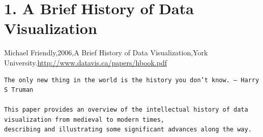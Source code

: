 \documentclass[]{book}
\theoremstyle{definition}
\theoremstyle{definition}
\theoremstyle{definition}
\theoremstyle{remark}
\begin{document}
\section{1. A Brief History of Data
Visualization}\label{a-brief-history-of-data-visualization}

Michael Friendly,2006,A Brief History of Data Visualization,York
University.\url{http://www.datavis.ca/papers/hbook.pdf}

\begin{verbatim}
The only new thing in the world is the history you don’t know. — Harry S Truman

This paper provides an overview of the intellectual history of data visualization from medieval to modern times,
describing and illustrating some significant advances along the way.
\end{verbatim}
\end{document}
